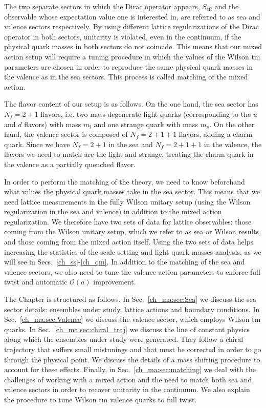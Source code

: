 The two separate sectors in which the Dirac operator appears, $S_{\textrm{eff}}$ and the observable whose expectation value one is interested in, are referred to as sea and valence sectors respectively. By using different lattice regularizations of the Dirac operator in both sectors, unitarity is violated, even in the continuum, if the physical quark masses in both sectors do not coincide. This means that our mixed action setup will require a tuning procedure in which the values of the Wilson tm parameters are chosen in order to reproduce the same physical quark masses in the valence as in the sea sectors. This process is called matching of the mixed action.

The flavor content of our setup is as follows. On the one hand, the sea sector has $N_f=2+1$ flavors, i.e. two mass-degenerate light quarks (corresponding to the $u$ and $d$ flavors) with mass $m_l$ and one strange quark with mass $m_s$. On the other hand, the valence sector is composed of $N_f=2+1+1$ flavors, adding a charm quark. Since we have $N_f=2+1$ in the sea and $N_f=2+1+1$ in the valence, the flavors we need to match are the light and strange, treating the charm quark in the valence as a partially quenched flavor. 

In order to perform the matching of the theory, we need to know beforehand what values the physical quark masses take in the sea sector. This means that we need lattice measurements in the fully Wilson unitary setup (using the Wilson regularization in the sea and valence) in addition to the mixed action regularization. We therefore have two sets of data for lattice observables: those coming from the Wilson unitary setup, which we refer to as sea or Wilson results, and those coming from the mixed action itself. Using the two sets of data helps increasing the statistics of the scale setting and light quark masses analysis, as we will see in Secs.~\ref{ch_ss}-\ref{ch_qm}. In addition to the matching of the sea and valence sectors, we also need to tune the valence action parameters to enforce full twist and automatic $\mathcal{O}(a)$ improvement.

The Chapter is structured as follows. In Sec.~\ref{ch_ma:sec:Sea} we discuss the sea sector details: ensembles under study, lattice actions and boundary conditions. In Sec.~\ref{ch_ma:sec:Valence} we discuss the valence sector, which employs Wilson tm quarks. In Sec.~\ref{ch_ma:sec:chiral_traj} we discuss the line of constant physics along which the ensembles under study were generated. They follow a chiral trajectory that suffers small mistunings and that must be corrected in order to go through the physical point. We discuss the details of a mass shifting procedure to account for these effects. Finally, in Sec.~\ref{ch_ma:sec:matching} we deal with the challenges of working with a mixed action and the need to match both sea and valence sectors in order to recover unitarity in the continuum. We also explain the procedure to tune Wilson tm valence quarks to full twist.

